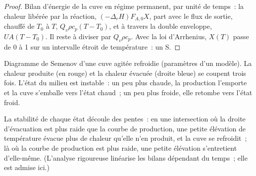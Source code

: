 \begin{proof}
Bilan d'énergie de la cuve en régime permanent, par unité de temps~: la chaleur
libérée par la réaction, $(-\Delta_r H)F_{A,0}X$, part avec le flux de
sortie, chauffé de $T_0$ à $T$, $Q_v\rho c_p(T - T_0)$, et à travers
la double enveloppe, $UA(T - T_0)$. Il reste à diviser par $Q_v\rho c_p$. Avec la loi d'Arrhenius,
$X(T)$ passe de 0 à 1 sur un intervalle étroit de température~: un S.
\end{proof}

\begin{omfigure}

{\small Diagramme de Semenov d'une cuve agitée refroidie (paramètres d'un modèle). La
chaleur produite (en rouge) et la chaleur évacuée (droite bleue) se coupent trois fois. L'état
du milieu est instable~: un peu plus chaude, la production l'emporte et la cuve
s'emballe vers l'état chaud~; un peu plus froide, elle retombe vers l'état
froid.}
\end{omfigure}

La stabilité de chaque état découle des pentes~: en une intersection
où la droite d'évacuation est plus raide que la courbe de production, une petite élévation de
température évacue plus de chaleur qu'elle n'en produit, et la cuve se refroidit~;
là où la courbe de production est plus raide, une petite élévation s'entretient d'elle-même. (L'analyse
rigoureuse linéarise les bilans dépendant du temps~; elle est admise
ici.)

